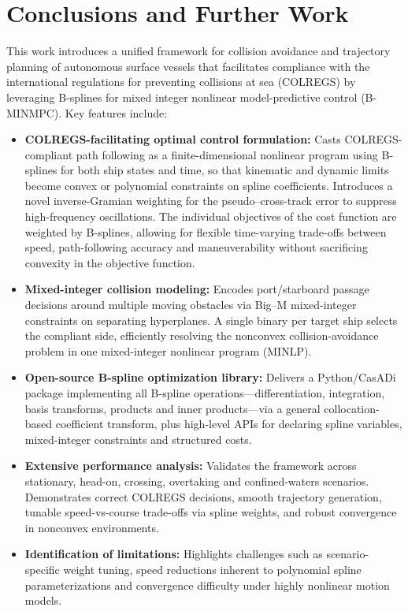 
\chapter{Conclusions and Further Work}
\label{chap:conclusions}

This work introduces a unified framework for collision avoidance and trajectory planning of autonomous surface vessels that facilitates compliance with the international regulations for preventing collisions at sea (COLREGS) by leveraging B‐splines for mixed integer nonlinear model‐predictive control (B-MINMPC).  Key features include:

\begin{itemize}
    \item \textbf{COLREGS-facilitating optimal control formulation:}  Casts COLREGS-compliant path following as a finite-dimensional nonlinear program using B-splines for both ship states and time, so that kinematic and dynamic limits become convex or polynomial constraints on spline coefficients. Introduces a novel inverse-Gramian weighting for the pseudo–cross-track error to suppress high-frequency oscillations. The individual objectives of the cost function are weighted by B-splines, allowing for flexible time-varying trade-offs between speed, path-following accuracy and maneuverability without sacrificing convexity in the objective function.

    \item \textbf{Mixed-integer collision modeling:}  Encodes port/starboard passage decisions around multiple moving obstacles via Big–M mixed-integer constraints on separating hyperplanes. A single binary per target ship selects the compliant side, efficiently resolving the nonconvex collision-avoidance problem in one mixed-integer nonlinear program (MINLP).

    \item \textbf{Open-source B-spline optimization library:}  Delivers a Python/CasADi package implementing all B-spline operations---differentiation, integration, basis transforms, products and inner products---via a general collocation-based coefficient transform, plus high-level APIs for declaring spline variables, mixed-integer constraints and structured costs.

    \item \textbf{Extensive performance analysis:}  Validates the framework across stationary, head-on, crossing, overtaking and confined-waters scenarios. Demonstrates correct COLREGS decisions, smooth trajectory generation, tunable speed-vs-course trade-offs via spline weights, and robust convergence in nonconvex environments. 

    \item \textbf{Identification of limitations:}  Highlights challenges such as scenario-specific weight tuning, speed reductions inherent to polynomial spline parameterizations and convergence difficulty under highly nonlinear motion models. 
\end{itemize}


